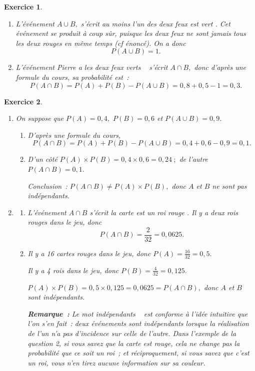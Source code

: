 \documentclass[10pt]{article}
\newtheorem{exo}{Exercice}
\begin{document}
\begin{exo}

\begin{enumerate}
\item L’événement $A\cup B,$ s'écrit \og au moins l'un des deux feux est vert \fg. Cet événement se produit à coup sûr, puisque les deux feux ne sont jamais tous les deux rouges en même temps (cf énoncé). On a donc \[P(A\cup B)=1.\]
\item L'événement \og Pierre a les deux feux verts \fg~{} s'écrit $A\cap B,$ donc d'après une formule du cours, sa probabilité est~:
\[P(A\cap B)=P(A)+P(B)-P(A\cup B)=0,8+0,5-1=0,3.\]
\end{enumerate}

\end{exo}

\begin{exo}


\begin{enumerate}
\item On suppose que $P(A)=0,4,$ $P(B)=0,6$ et $P(A\cup B)=0,9.$
\begin{enumerate}
\item D'après une formule du cours, \[P(A\cap B)=P(A)+P(B)-P(A\cup B)=0,4+0,6-0,9=0,1.\]
\item D'un côté $P(A)\times P(B)=0,4\times 0,6=0,24~;$ de l'autre $P(A\cap B)=0,1.$

Conclusion~: $P(A\cap B)\not=P(A)\times P(B),$ donc $A$ et $B$ ne sont pas indépendants.
\end{enumerate}
\item \begin{enumerate}
\item L'événement $A\cap B$ s'écrit \og la carte est un roi rouge \fg. Il y a deux rois rouges dans le jeu, donc \[P(A\cap B)=\frac{2}{32}=0,0625.\]
\item Il y a 16 cartes rouges dans le jeu, donc $P(A)=\frac{16}{32}=0,5.$

Il y a 4 rois dans le jeu, donc $P(B)=\frac{4}{32}=0,125.$

$P(A)\times P(B)=0,5\times 0,125=0,0625=P(A\cap B),$ donc $A$ et $B$ sont indépendants.

\medskip

\textbf{Remarque~:} Le mot \og indépendants \fg~{} est conforme à l'idée intuitive que l'on s'en fait~: deux événements sont indépendants lorsque la réalisation de l'un n'a pas d'incidence sur celle de l'autre. Dans l'exemple de la question 2, si vous savez que la carte est rouge, cela ne change pas la probabilité que ce soit un roi~; et réciproquement, si vous savez que c'est un roi, vous n'en tirez aucune information sur sa couleur.


\end{enumerate}
\end{enumerate}
\end{exo}
\end{document}
